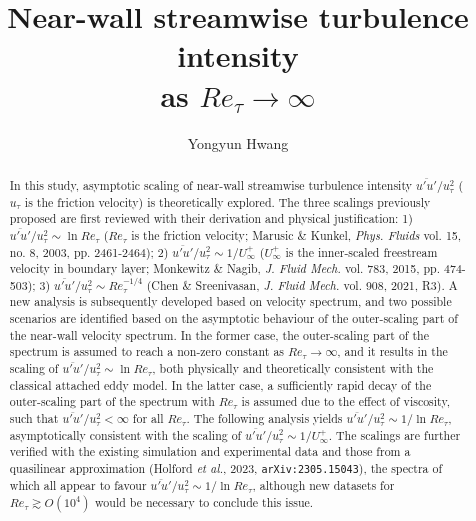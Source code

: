 \documentclass{jfm}
\title{Near-wall streamwise turbulence intensity \\ as $Re_\tau \rightarrow \infty$}
\author{Yongyun Hwang\corresp{\email{y.hwang@imperial.ac.uk}}}
\affiliation{Department of Aeronautics, Imperial College London,
South Kensington, SW7 2AZ, UK}
\begin{document}
\maketitle

\begin{abstract}
In this study, asymptotic scaling of near-wall streamwise turbulence intensity $\overline{u'u'}/u_\tau^2$ ($u_\tau$ is the friction velocity) is theoretically explored. The three scalings previously proposed are first reviewed with their derivation and physical justification: 1) $\overline{u'u'}/u_\tau^2 \sim \ln Re_\tau$ ($Re_\tau$ is the friction velocity; Marusic \& Kunkel, \emph{Phys. Fluids} vol. 15, no. 8, 2003, pp. 2461-2464); 2) $\overline{u'u'}/u_\tau^2 \sim 1/U_\infty^+$ ($U_\infty^+$ is the inner-scaled freestream velocity in boundary layer; Monkewitz \& Nagib, \emph{J. Fluid Mech.} vol. 783, 2015, pp. 474-503); 3) $\overline{u'u'}/u_\tau^2 \sim Re_\tau^{-1/4}$ (Chen \& Sreenivasan, \emph{J. Fluid Mech.} vol. 908, 2021, R3). A new analysis is subsequently developed based on velocity spectrum, and two possible scenarios are identified based on the asymptotic behaviour of the outer-scaling part of the near-wall velocity spectrum. In the former case, the outer-scaling part of the spectrum is assumed to reach a non-zero constant as $Re_\tau \rightarrow \infty$, and it results in the scaling of $\overline{u'u'}/u_\tau^2 \sim \ln Re_\tau$, both physically and theoretically consistent with the classical attached eddy model. In the latter case, a sufficiently rapid decay of the outer-scaling part of the spectrum with $Re_\tau$ is assumed due to the effect of viscosity, such that $\overline{u'u'}/u_\tau^2 < \infty$ for all $Re_\tau$. The following analysis yields $\overline{u'u'}/u_\tau^2 \sim 1/\ln Re_\tau$, asymptotically consistent with the scaling of $\overline{u'u'}/u_\tau^2 \sim 1/U_\infty^+$. The scalings are further verified with the existing simulation and experimental data and those from a quasilinear approximation (Holford \emph{et al.}, 2023, \texttt{arXiv:2305.15043}), the spectra of which all appear to favour $\overline{u'u'}/u_\tau^2 \sim 1/\ln Re_\tau$, although new datasets for $Re_\tau \gtrsim O(10^4)$ would be necessary to conclude this issue.
\end{abstract}
\end{document}
